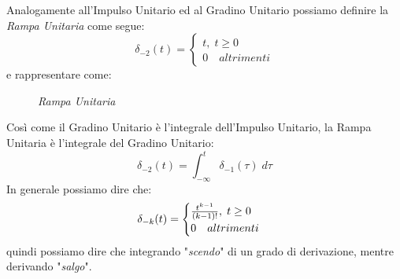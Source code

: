 \documentclass{article}
\begin{document}
			Analogamente all'Impulso Unitario ed al Gradino Unitario possiamo definire la \textit{Rampa Unitaria} come segue:
			\[
				\delta_{-2}(t)=
				\begin{cases}
					t,\; t\geq0 \\
					0\quad altrimenti
				\end{cases}
			\]
			e rappresentare come:
			\begin{figure} [h!]
				\begin{center}
				\end{center}
				\captionsetup{labelformat=empty}
				\caption{\textit{Rampa Unitaria}}
			\end{figure}

			\newpage

			Così come il Gradino Unitario è l'integrale dell'Impulso Unitario, la Rampa Unitaria è l'integrale del Gradino Unitario:
			\[
				\delta_{-2}(t)=\int_{-\infty}^{t}{\delta_{-1}(\tau)\; d\tau}
			\]
			In generale possiamo dire che:
			\[
				\delta_{-k}(t)=
				\begin{cases}
					{{t^{k-1}}\over{(k-1)!}},\; t\geq0 \\
					0\quad altrimenti
				\end{cases}
			\]
			quindi possiamo dire che integrando "\textit{scendo}" di un grado di derivazione, mentre derivando "\textit{salgo}".
\end{document}
